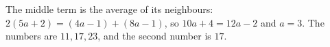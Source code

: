 The middle term is the average of its neighbours: $2(5a+2)=(4a-1)+(8a-1)$, so $10a+4=12a-2$ and $a=3$. The numbers are $11,17,23$, and the second number is $\boxed{17}$.
